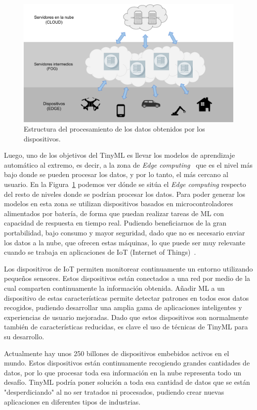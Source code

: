 \documentclass[a4paper, 12pt]{book}
\begin{document}
\begin{figure}[htb]
  \centering
  \includegraphics[width=12cm, keepaspectratio]{img/edge_computing.pdf}
  \caption{Estructura del procesamiento de los datos obtenidos por los dispositivos.}\label{fig:edge_computing}
\end{figure}

Luego, uno de los objetivos del TinyML es llevar los modelos de aprendizaje automático al extremo, es decir, a la zona de \textit{Edge computing}~\cite{Khan2019} que es el nivel más bajo donde se pueden procesar los datos, y por lo tanto, el más cercano al usuario. En la Figura~\ref{fig:edge_computing} podemos ver dónde se sitúa el \textit{Edge computing} respecto del resto de niveles donde se podrían procesar los datos. Para poder generar los modelos en esta zona se utilizan dispositivos basados en microcontroladores alimentados por batería, de forma que puedan realizar tareas de ML con capacidad de respuesta en tiempo real. Pudiendo beneficiarnos de la gran portabilidad, bajo consumo y mayor seguridad, dado que no es necesario enviar los datos a la nube, que ofrecen estas máquinas, lo que puede ser muy relevante cuando se trabaja en aplicaciones de IoT (Internet of Things)~\cite{Rose2015}. 

Los dispositivos de IoT permiten monitorear continuamente un entorno utilizando pequeños sensores. Estos dispositivos están conectados a una red por medio de la cual comparten continuamente la información obtenida. Añadir ML a un dispositivo de estas características permite detectar patrones en todos esos datos recogidos, pudiendo desarrollar una amplia gama de aplicaciones inteligentes y experiencias de usuario mejoradas. Dado que estos dispositivos son normalmente también de características reducidas, es clave el uso de técnicas de TinyML para su desarrollo.

Actualmente hay unos 250 billones de dispositivos embebidos activos en el mundo. Estos dispositivos están continuamente recogiendo grandes cantidades de datos, por lo que procesar toda esa información en la nube representa todo un desafío. TinyML podría poner solución a toda esa cantidad de datos que se están "desperdiciando" al no ser tratados ni procesados, pudiendo crear nuevas aplicaciones en diferentes tipos de industrias.
\end{document}
